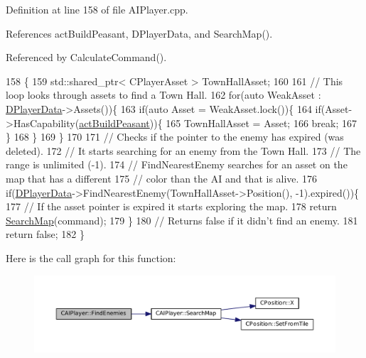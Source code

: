 Definition at line 158 of file A\+I\+Player.\+cpp.



References act\+Build\+Peasant, D\+Player\+Data, and Search\+Map().



Referenced by Calculate\+Command().


\begin{DoxyCode}
158                                                          \{
159     std::shared\_ptr< CPlayerAsset > TownHallAsset;
160     
161     \textcolor{comment}{// This loop looks through assets to find a Town Hall.}
162     \textcolor{keywordflow}{for}(\textcolor{keyword}{auto} WeakAsset : \hyperlink{classCAIPlayer_a83b5113c8f7e80df54940b647c5ee2e6}{DPlayerData}->Assets())\{
163         \textcolor{keywordflow}{if}(\textcolor{keyword}{auto} Asset = WeakAsset.lock())\{
164             \textcolor{keywordflow}{if}(Asset->HasCapability(\hyperlink{GameDataTypes_8h_a35b98ce26aca678b03c6f9f76e4778cea66c601dce0fc095460b3c2c25f66ee71}{actBuildPeasant}))\{
165                 TownHallAsset = Asset;
166                 \textcolor{keywordflow}{break};
167             \}
168         \}
169     \}
170 
171     \textcolor{comment}{// Checks if the pointer to the enemy has expired (was deleted).}
172     \textcolor{comment}{// It starts searching for an enemy from the Town Hall. }
173     \textcolor{comment}{// The range is unlimited (-1).}
174     \textcolor{comment}{// FindNearestEnemy searches for an asset on the map that has a different }
175     \textcolor{comment}{// color than the AI and that is alive.}
176     \textcolor{keywordflow}{if}(\hyperlink{classCAIPlayer_a83b5113c8f7e80df54940b647c5ee2e6}{DPlayerData}->FindNearestEnemy(TownHallAsset->Position(), -1).expired())\{
177         \textcolor{comment}{// If the asset pointer is expired it starts exploring the map.}
178         \textcolor{keywordflow}{return} \hyperlink{classCAIPlayer_afafbe8fc589e09a16ae1f02f2794d7b0}{SearchMap}(command);
179     \}
180     \textcolor{comment}{// Returns false if it didn't find an enemy.}
181     \textcolor{keywordflow}{return} \textcolor{keyword}{false};    
182 \}
\end{DoxyCode}
Here is the call graph for this function\+:\nopagebreak
\begin{figure}[H]
\begin{center}
\leavevmode
\includegraphics[width=350pt]{classCAIPlayer_a33b1533570e7a00114d1b85b3551e395_cgraph}
\end{center}
\end{figure}
